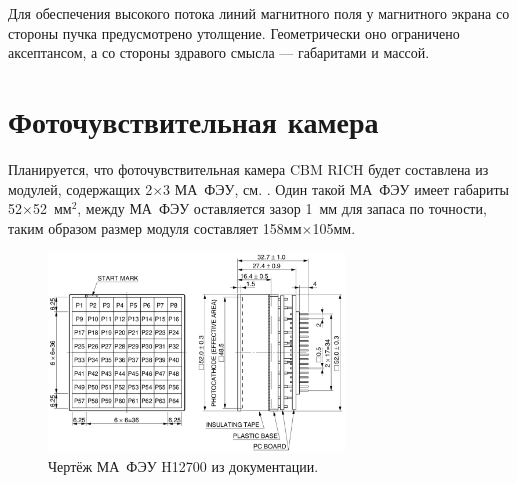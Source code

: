 Для обеспечения высокого потока линий магнитного поля у магнитного экрана со стороны пучка предусмотрено утолщение. Геометрически оно ограничено аксептансом, а со стороны здравого смысла --- габаритами и массой.

%                                      

\section{Фоточувствительная камера}\label{sec:secRICHgeoCamera}

Планируется, что фоточувствительная камера CBM RICH будет составлена из модулей, содержащих 2$\times$3 МА~ФЭУ, см. . Один такой МА~ФЭУ имеет габариты 52$\times$52~мм$^2$, между МА~ФЭУ оставляется зазор 1~мм для запаса по точности, таким образом размер модуля составляет 158мм$\times$105мм.

\begin{figure}[H]
\centering
\includegraphics[width=0.7\textwidth]{pictures/H12700_drawing.png}
\caption{Чертёж МА~ФЭУ H12700 из документации.}
\label{fig:H12700drawing}
\end{figure}

